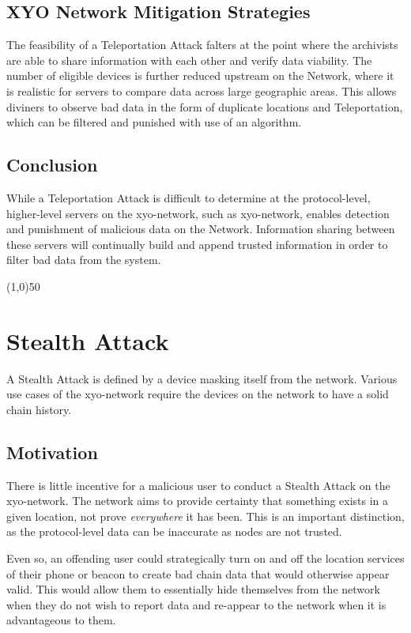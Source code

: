 \documentclass{article}
\begin{document}
\subsection{XYO Network Mitigation Strategies}
The feasibility of a Teleportation Attack falters at the point where the \Glspl{archivist} are able to share information with each other and verify data viability. The number of eligible devices is further reduced upstream on the Network, where it is realistic for servers to compare data across large geographic areas. This allows \Glspl{diviner} to observe bad data in the form of duplicate locations and Teleportation, which can be filtered and punished with use of an algorithm. 

\subsection{Conclusion}
While a Teleportation Attack is difficult to determine at the protocol-level, higher-level servers on the \Gls{xyo-network}, such as \Gls{xyo-network}, enables detection and punishment of malicious data on the Network. Information sharing between these servers will continually build and append trusted information in order to filter bad data from the system.

\begin{center}
\line(1,0){50}
\end{center}

\section{Stealth Attack}
A Stealth Attack is defined by a device masking itself from the network. Various use cases of the \Gls{xyo-network} require the devices on the network to have a solid chain history. 

\subsection{Motivation}
There is little incentive for a malicious user to conduct a Stealth Attack on the \Gls{xyo-network}. The network aims to provide certainty that something exists in a given location, not prove \textit{everywhere} it has been. This is an important distinction, as the protocol-level data can be inaccurate as nodes are not trusted.

Even so, an offending user could strategically turn on and off the location services of their phone or beacon to create bad chain data that would otherwise appear valid. This would allow them to essentially hide themselves from the network when they do not wish to report data and re-appear to the network when it is advantageous to them.
\end{document}
